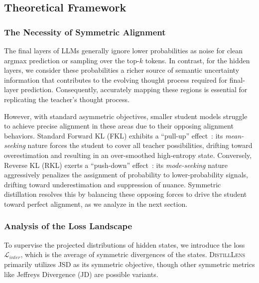 \documentclass{article}
\theoremstyle{plain}
\theoremstyle{definition}
\theoremstyle{remark}
\begin{document}
\subsection{Theoretical Framework}

\subsubsection{The Necessity of Symmetric Alignment}
The final layers of LLMs generally ignore lower probabilities as noise for clean argmax prediction or sampling over the top-$k$ tokens.
In contrast, for the hidden layers, we consider these probabilities a richer source of semantic uncertainty information that contributes to the evolving thought process required for final-layer prediction.
Consequently, accurately mapping these regions is essential for replicating the teacher's thought process.

However, with standard asymmetric objectives, smaller student models struggle to achieve precise alignment in these areas due to their opposing alignment behaviors.
Standard Forward KL (FKL) exhibits a ``pull-up'' effect~\cite{wu2024rethinking,kodistillm}: its \textit{mean-seeking} nature forces the student to cover all teacher possibilities, drifting toward overestimation and resulting in an over-smoothed high-entropy state. 
Conversely, Reverse KL (RKL) exerts a ``push-down'' effect~\cite{wu2024rethinking,kodistillm}: its \textit{mode-seeking} nature aggressively penalizes the assignment of probability to lower-probability signals, drifting toward underestimation and suppression of nuance. 
Symmetric distillation resolves this by balancing these opposing forces to drive the student toward perfect alignment, as we analyze in the next section.

\subsubsection{Analysis of the Loss Landscape}\label{sec:theoretical_analysis}
To supervise the projected distributions of hidden states, we introduce the loss $\mathcal{L}_{inter}$, which is the average of symmetric divergences of the states. 
\textsc{DistillLens} primarily utilizes JSD as its symmetric objective, though other symmetric metrics like Jeffreys Divergence (JD) \cite{jeffreys1948theory} are possible variants.
\end{document}
